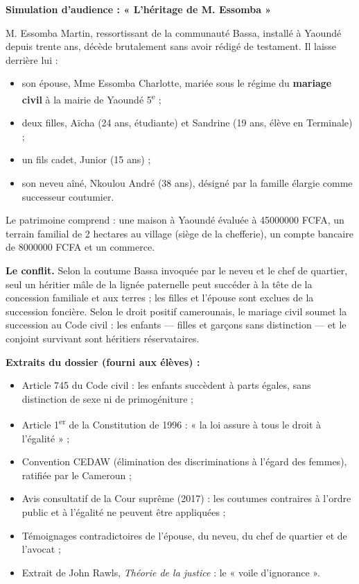 \documentclass[11pt]{article}
\newcounter{popsec}
\newcounter{popsub}
\newcommand{\courssub}[1]{%
  \stepcounter{popsub}%
  \par\vspace{9pt}\noindent{\popxbold\fontsize{11.5}{13}\selectfont\color{popink}{\color{poporange}\thepopsec.\thepopsub}\hspace{6pt}#1}\par\nopagebreak\vspace{4pt}
}
\begin{document}
\courssub{Situation}

\textbf{Simulation d'audience : « L'héritage de M. Essomba »}

M. Essomba Martin, ressortissant de la communauté Bassa, installé à Yaoundé depuis trente ans, décède brutalement sans avoir rédigé de testament. Il laisse derrière lui :

\begin{itemize}
\item son épouse, Mme Essomba Charlotte, mariée sous le régime du \textbf{mariage civil} à la mairie de Yaoundé 5\textsuperscript{e} ;
\item deux filles, Aïcha (24 ans, étudiante) et Sandrine (19 ans, élève en Terminale) ;
\item un fils cadet, Junior (15 ans) ;
\item son neveu aîné, Nkoulou André (38 ans), désigné par la famille élargie comme successeur coutumier.
\end{itemize}

Le patrimoine comprend : une maison à Yaoundé évaluée à \num{45000000} FCFA, un terrain familial de 2 hectares au village (siège de la chefferie), un compte bancaire de \num{8000000} FCFA et un commerce.

\textbf{Le conflit.} Selon la coutume Bassa invoquée par le neveu et le chef de quartier, seul un héritier mâle de la lignée paternelle peut succéder à la tête de la concession familiale et aux terres ; les filles et l'épouse sont exclues de la succession foncière. Selon le droit positif camerounais, le mariage civil soumet la succession au Code civil : les enfants — filles et garçons sans distinction — et le conjoint survivant sont héritiers réservataires.

\textbf{Extraits du dossier (fourni aux élèves) :}
\begin{itemize}
\item Article 745 du Code civil : les enfants succèdent à parts égales, sans distinction de sexe ni de primogéniture ;
\item Article 1\textsuperscript{er} de la Constitution de 1996 : « la loi assure à tous le droit à l'égalité » ;
\item Convention CEDAW (élimination des discriminations à l'égard des femmes), ratifiée par le Cameroun ;
\item Avis consultatif de la Cour suprême (2017) : les coutumes contraires à l'ordre public et à l'égalité ne peuvent être appliquées ;
\item Témoignages contradictoires de l'épouse, du neveu, du chef de quartier et de l'avocat ;
\item Extrait de John Rawls, \emph{Théorie de la justice} : le « voile d'ignorance ».
\end{itemize}
\end{document}
